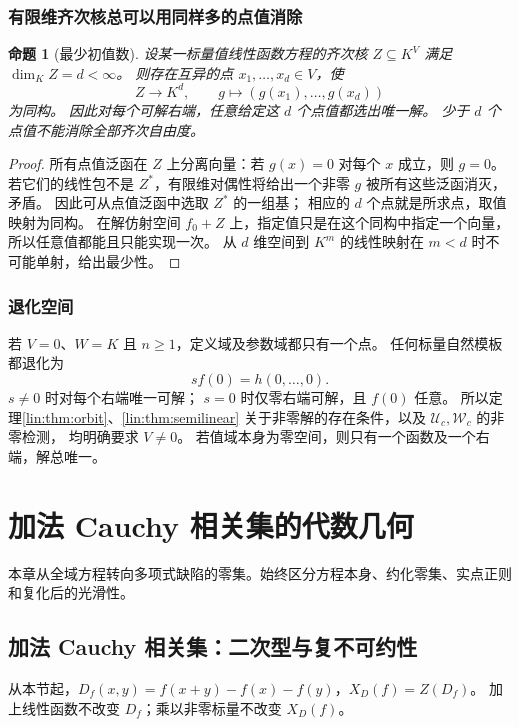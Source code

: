 \documentclass[11pt,a4paper,oneside,openany]{book}
\theoremstyle{lecture}
\newtheorem{proposition}[theorem]{命题}
\newcommand{\Uc}{\mathscr U_c}
\newcommand{\Wc}{\mathscr W_c}
\numberwithin{equation}{section}
\begin{document}
\subsection{有限维齐次核总可以用同样多的点值消除}
\begin{proposition}[最少初值数]\label{lin:prop:initialvalues}
设某一标量值线性函数方程的齐次核 $Z\subseteq K^V$
满足 $\dim_KZ=d<\infty$。
则存在互异的点 $x_1,\ldots,x_d\in V$，使
\[
 Z\longrightarrow K^d,\qquad
 g\longmapsto(g(x_1),\ldots,g(x_d))
\]
为同构。
因此对每个可解右端，任意给定这 $d$ 个点值都选出唯一解。
少于 $d$ 个点值不能消除全部齐次自由度。
\end{proposition}
\begin{proof}
所有点值泛函在 $Z$ 上分离向量：若 $g(x)=0$ 对每个 $x$ 成立，则 $g=0$。
若它们的线性包不是 $Z^*$，有限维对偶性将给出一个非零 $g$
被所有这些泛函消灭，矛盾。
因此可从点值泛函中选取 $Z^*$ 的一组基；
相应的 $d$ 个点就是所求点，取值映射为同构。
在解仿射空间 $f_0+Z$ 上，指定值只是在这个同构中指定一个向量，
所以任意值都能且只能实现一次。
从 $d$ 维空间到 $K^m$ 的线性映射在 $m<d$ 时不可能单射，给出最少性。
\end{proof}

\subsection{退化空间}
若 $V=0$、$W=K$ 且 $n\ge1$，定义域及参数域都只有一个点。
任何标量自然模板都退化为
\[
 s f(0)=h(0,\ldots,0).
\]
$s\ne0$ 时对每个右端唯一可解；
$s=0$ 时仅零右端可解，且 $f(0)$ 任意。
所以定理\ref{lin:thm:orbit}、\ref{lin:thm:semilinear}
关于非零解的存在条件，以及 $\Uc,\Wc$ 的非零检测，
均明确要求 $V\ne0$。
若值域本身为零空间，则只有一个函数及一个右端，解总唯一。


\chapter{加法 Cauchy 相关集的代数几何}\label{ch:addgeom}
本章从全域方程转向多项式缺陷的零集。始终区分方程本身、约化零集、实点正则和复化后的光滑性。
\section{加法 Cauchy 相关集：二次型与复不可约性}\label{geo:sec:geometry}
从本节起，$D_f(x,y)=f(x+y)-f(x)-f(y)$，$X_D(f)=Z(D_f)$。
加上线性函数不改变 $D_f$；乘以非零标量不改变 $X_D(f)$。
\end{document}
